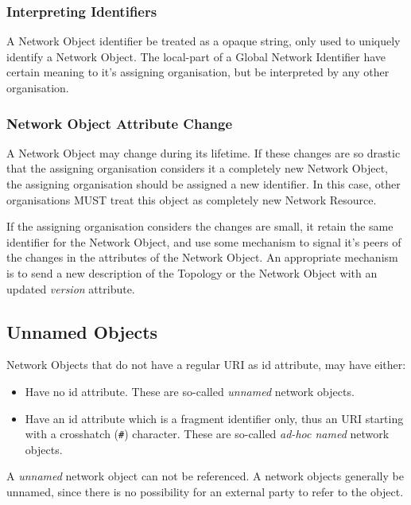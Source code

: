 \subsubsection{Interpreting Identifiers}

A Network Object identifier \MUST{} be treated as a opaque string, only used to uniquely identify a Network Object. The local-part of a Global Network Identifier \MAY{} have certain meaning to it's assigning organisation, but \MUSTNOT{} be interpreted by any other organisation.

\subsubsection{Network Object Attribute Change}

A Network Object may change during its lifetime. If these changes are so drastic that the assigning organisation considers it a completely new Network Object, the assigning organisation should be assigned a new identifier. In this case, other organisations MUST treat this object as completely new Network Resource.

If the assigning organisation considers the changes are small, it \MUST{} retain the same identifier for the Network Object, and use some mechanism to signal it's peers of the changes in the attributes of the Network Object. An appropriate mechanism is to send a new description of the Topology or the Network Object with an updated \emph{version} attribute.

\subsection{Unnamed Objects}%
\label{sub:unnamed_objects}

Network Objects that do not have a regular URI as id attribute, may have either:
\begin{itemize}
    \item Have no id attribute. These are so-called \emph{unnamed} network objects.
    \item Have an id attribute which is a fragment identifier only, thus an URI starting with a crosshatch (\texttt{\#}) character. These are so-called \emph{ad-hoc named} network objects.
\end{itemize}

A \emph{unnamed} network object can not be referenced. A network objects generally \SHOULDNOT{} be unnamed, since there is no possibility for an external party to refer to the object.

